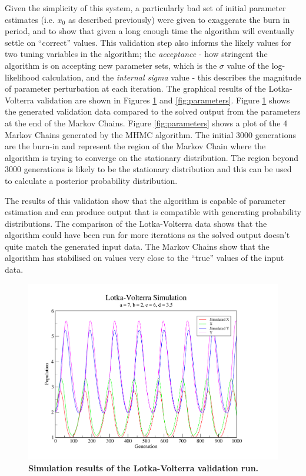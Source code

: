 Given the simplicity of this system, a particularly bad set of initial parameter estimates (i.e. $x_0$ as described previously) were given to exaggerate the burn in period, and to show that given a long enough time the algorithm will eventually settle on ``correct'' values. This validation step also informs the likely values for two tuning variables in the algorithm; the \textit{acceptance} - how stringent the algorithm is on accepting new parameter sets, which is the $\sigma$ value of the log-likelihood calculation, and the \textit{internal sigma} value - this describes the magnitude of parameter perturbation at each iteration.
The graphical results of the Lotka-Volterra validation are shown in Figures \ref{fig:simulation} and \ref{fig:parameters}. Figure \ref{fig:simulation} shows the generated validation data compared to the solved output from the parameters at the end of the Markov Chains. Figure \ref{fig:parameters} shows a plot of the 4 Markov Chains generated by the MHMC algorithm. The initial 3000 generations are the burn-in and represent the region of the Markov Chain where the algorithm is trying to converge on the stationary distribution. The region beyond 3000 generations is likely to be the stationary distribution and this can be used to calculate a posterior probability distribution.

The results of this validation show that the algorithm is capable of parameter estimation and can produce output that is compatible with generating probability distributions. The comparison of the Lotka-Volterra data shows that the algorithm could have been run for more iterations as the solved output doesn't quite match the generated input data. The Markov Chains show that the algorithm has stabilised on values very close to the ``true'' values of the input data.

\begin{figure}[tbp]
 \centering
 \includegraphics[width=13cm, trim=50px 35px 125px 30px, clip=true]{./03-parameterestimationmethodologies/data/LV_data.pdf}
 \caption[{Simulation results of the Lotka-Volterra validation run.}]{{\bf Simulation results of the Lotka-Volterra validation run.}
 \label{fig:simulation}}
\end{figure}


